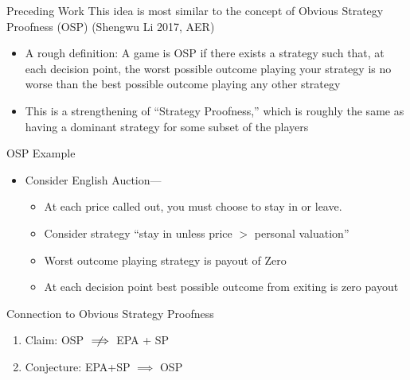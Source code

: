 \documentclass{beamer}
\begin{document}
\begin{frame}{Preceding Work}
	This idea is most similar to the concept of Obvious Strategy Proofness (OSP) (Shengwu Li 2017, AER)
	\begin{itemize}
		\item A rough definition: A game is OSP if there exists a strategy such that, at each decision point, the worst possible outcome playing your strategy is no worse than the best possible outcome playing any other strategy
		\item This is a strengthening of “Strategy Proofness,” which is roughly the same as having a dominant strategy for some subset of the players

	\end{itemize}
\end{frame}


\begin{frame}{OSP Example}
	\begin{itemize}
		\item Consider English Auction—
		\begin{itemize}
			\item At each price called out, you must choose to stay in or leave.  
			\item Consider strategy “stay in unless price $>$ personal valuation”
			\item Worst outcome playing strategy is payout of Zero
			\item At each decision point best possible outcome from exiting is zero payout
		\end{itemize}
	\end{itemize}
\end{frame}


\begin{frame}{Connection to Obvious Strategy Proofness}
	\begin{enumerate}
		\item Claim: OSP $\centernot\implies$ EPA + SP 
		\item Conjecture: EPA+SP $\implies$ OSP
	\end{enumerate}
\end{frame}
\end{document}
